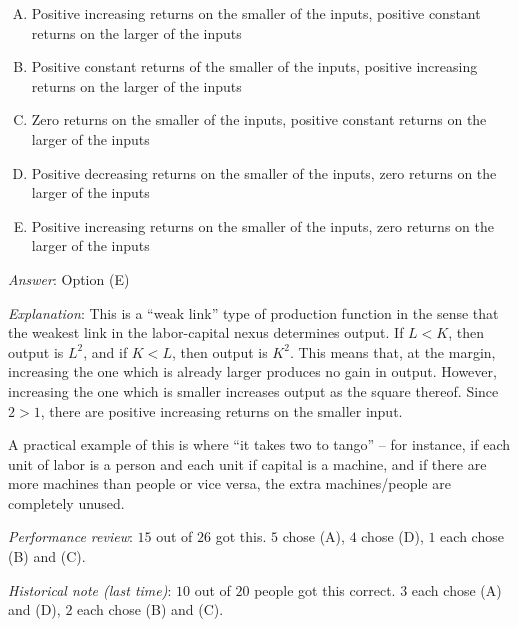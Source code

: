 \documentclass[10pt]{amsart}
\begin{document}
\begin{enumerate}
  \begin{enumerate}[(A)]
  \item Positive increasing returns on the smaller of the inputs,
    positive constant returns on the larger of the inputs
  \item Positive constant returns of the smaller of the inputs,
    positive increasing returns on the larger of the inputs
  \item Zero returns on the smaller of the inputs, positive constant
    returns on the larger of the inputs
  \item Positive decreasing returns on the smaller of the inputs, zero
    returns on the larger of the inputs
  \item Positive increasing returns on the smaller of the inputs, zero
    returns on the larger of the inputs
  \end{enumerate}

  {\em Answer}: Option (E)

  {\em Explanation}: This is a ``weak link'' type of production
  function in the sense that the weakest link in the labor-capital
  nexus determines output. If $L < K$, then output is $L^2$, and if $K
  < L$, then output is $K^2$. This means that, at the margin,
  increasing the one which is already larger produces no gain in
  output. However, increasing the one which is smaller increases
  output as the square thereof. Since $2 > 1$, there are positive
  increasing returns on the smaller input.

  A practical example of this is where ``it takes two to tango'' --
  for instance, if each unit of labor is a person and each unit if
  capital is a machine, and if there are more machines than people or
  vice versa, the extra machines/people are completely unused.

  {\em Performance review}: $15$ out of $26$ got this. $5$ chose (A),
  $4$ chose (D), $1$ each chose (B) and (C).

  {\em Historical note (last time)}: $10$ out of $20$ people got this
  correct. $3$ each chose (A) and (D), $2$ each chose (B) and (C).

\end{enumerate}
\end{document}
